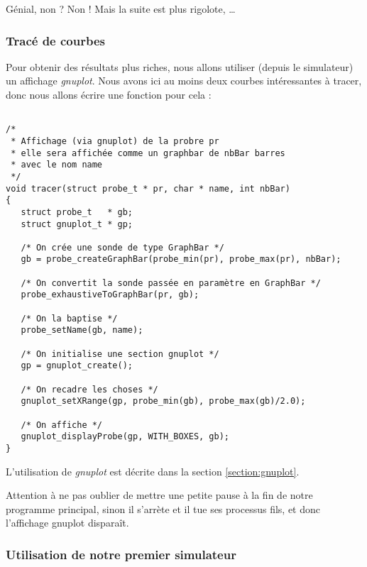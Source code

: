    Génial, non ? Non ! Mais la suite est plus rigolote, \ldots

%
\subsubsection{Tracé de courbes}

   Pour obtenir des résultats plus riches, nous allons utiliser
(depuis le simulateur) un affichage {\em gnuplot}. Nous avons ici au
moins deux courbes intéressantes à tracer, donc nous allons écrire une
 fonction pour cela :

\begin{verbatim}

/*
 * Affichage (via gnuplot) de la probre pr
 * elle sera affichée comme un graphbar de nbBar barres
 * avec le nom name
 */
void tracer(struct probe_t * pr, char * name, int nbBar)
{
   struct probe_t   * gb;
   struct gnuplot_t * gp;

   /* On crée une sonde de type GraphBar */
   gb = probe_createGraphBar(probe_min(pr), probe_max(pr), nbBar);

   /* On convertit la sonde passée en paramètre en GraphBar */
   probe_exhaustiveToGraphBar(pr, gb);

   /* On la baptise */
   probe_setName(gb, name);

   /* On initialise une section gnuplot */
   gp = gnuplot_create();

   /* On recadre les choses */
   gnuplot_setXRange(gp, probe_min(gb), probe_max(gb)/2.0);

   /* On affiche */
   gnuplot_displayProbe(gp, WITH_BOXES, gb);
}
\end{verbatim}

   L'utilisation de {\em gnuplot} est décrite dans la section
\ref{section:gnuplot}.

   Attention à ne pas oublier de mettre une petite pause à la fin de
notre programme principal, sinon il s'arrète et il tue ses processus
fils, et donc l'affichage {\rm gnuplot} disparaît.

%
\subsubsection{Utilisation de notre premier simulateur}

